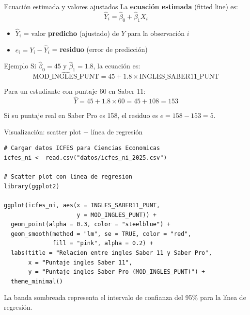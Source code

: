\documentclass[aspectratio=169, 11pt]{beamer}
\begin{document}
\begin{frame}{Ecuación estimada y valores ajustados}
La \textbf{ecuación estimada} (fitted line) es:
\[
\hat{Y}_i = \hat{\beta}_0 + \hat{\beta}_1 X_i
\]

\vspace{0.1cm}
\begin{itemize}
  \item $\hat{Y}_i$ = valor \textbf{predicho} (ajustado) de $Y$ para la observación $i$
  \item $e_i = Y_i - \hat{Y}_i$ = \textbf{residuo} (error de predicción)
\end{itemize}

\vspace{0.1cm}
\begin{exampleblock}{Ejemplo}
Si $\hat{\beta}_0 = 45$ y $\hat{\beta}_1 = 1.8$, la ecuación es:
\[
\widehat{\text{MOD\_INGLES\_PUNT}} = 45 + 1.8 \times \text{INGLES\_SABER11\_PUNT}
\]

Para un estudiante con puntaje 60 en Saber 11:
\[
\hat{Y} = 45 + 1.8 \times 60 = 45 + 108 = 153
\]

Si su puntaje real en Saber Pro es 158, el residuo es $e = 158 - 153 = 5$.
\end{exampleblock}
\end{frame}

\begin{frame}[fragile]{Visualización: scatter plot + línea de regresión}
\begin{lstlisting}
# Cargar datos ICFES para Ciencias Economicas
icfes_ni <- read.csv("datos/icfes_ni_2025.csv")

# Scatter plot con linea de regresion
library(ggplot2)

ggplot(icfes_ni, aes(x = INGLES_SABER11_PUNT,
                     y = MOD_INGLES_PUNT)) +
  geom_point(alpha = 0.3, color = "steelblue") +
  geom_smooth(method = "lm", se = TRUE, color = "red",
              fill = "pink", alpha = 0.2) +
  labs(title = "Relacion entre ingles Saber 11 y Saber Pro",
       x = "Puntaje ingles Saber 11",
       y = "Puntaje ingles Saber Pro (MOD_INGLES_PUNT)") +
  theme_minimal()
\end{lstlisting}

\vspace{0.2cm}
La banda sombreada representa el intervalo de confianza del 95\% para la línea de regresión.
\end{frame}
\end{document}
